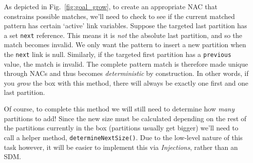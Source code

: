 As depicted in Fig.~\ref{fig:goal_grow}, to create an appropriate \mbox{NAC} that constrains possible matches, we'll need to check to see if the current matched
pattern has certain `active' link variables. Suppose the targeted last partition has a set \texttt{next} reference. This means it is \emph{not} the absolute
last partition, and so the match becomes invalid. We only want the pattern to insert a new partition when the \texttt{next} link is null. Similarly, if the
targeted first partition has a \texttt{previous} value, the match is invalid. The complete pattern match is therefore made unique through NACs and thus becomes
\emph{deterministic} by construction. In other words, if you \emph{grow} the box with this method, there will always be exactly one first and one last
partition.

Of course, to complete this method we will still need to determine how \emph{many} partitions to add! Since the new size must be calculated depending on the
rest of the partitions currently in the box (partitions usually get bigger) we'll need to call a helper method, \texttt{determineNextSize()}. Due to the
low-level nature of this task however, it will be easier to implement this via \emph{Injections}, rather than an SDM.







